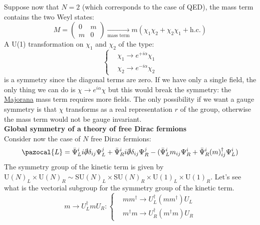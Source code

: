 \documentclass[../main.tex]{subfiles}
\begin{document}
Suppose now that $N=2$ (which corresponds to the case of QED), the mass term contains the two Weyl states:
\[
M=\left(\begin{array}{cc}
    0 & m \\
    m & 0
\end{array}\right)
\xrightarrow[\text{mass term}]{}
m(\chi_1\chi_2+\chi_2\chi_1+\text{h.c.})
\]
A U(1) transformation on $\chi_1$ and $\chi_2$ of the type:
\[
\left\{
\begin{aligned}
&\chi_1\to e^{+i\alpha}\chi_1\\
&\chi_2\to e^{-i\alpha}\chi_2
\end{aligned}
\right.
\]
is a symmetry since the diagonal terms are zero. 
If we have only a single field, the only thing we can do is $\chi\to e^{i\alpha}\chi$ but this would break the symmetry: the \href{https://en.wikipedia.org/wiki/Ettore_Majorana}{Majorana} mass term requires more fields. The only possibility if we want a gauge symmetry is that $\chi$ transforms as a real representation $r$ of the group, otherwise the mass term would not be gauge invariant.\\
\textbf{Global symmetry of a theory of free Dirac fermions}\\
Consider now the case of $N$ free Dirac fermions:
\[
\pazocal{L}=\bar{\Psi}_L^ii\slashed{\partial}\delta_{ij}\Psi_L^j+\bar{\Psi}_R^ii\slashed{\partial}\delta_{ij}\Psi_R^j-(\bar{\Psi}_L^im_{ij}\Psi_R^i+\bar{\Psi}_R^i(m)_{ij}^\dagger\Psi_L^i)
\]
The symmetry group of the kinetic term is given by\\
U$(N)_L\times$U$(N)_R\sim$SU$(N)_L\times$SU$(N)_R\times$U$(1)_L\times$U$(1)_R$. 
Let's see what is the vectorial subgroup for the symmetry group of the kinetic term.
\[
m\to U_L^\dagger mU_R:
\left\{
\begin{aligned}
&mm^\dagger\to U_L^\dagger(mm^\dagger)U_L\\
&m^\dagger m\to U_R^\dagger(m^\dagger m)U_R
\end{aligned}
\right.
\]
\end{document}
